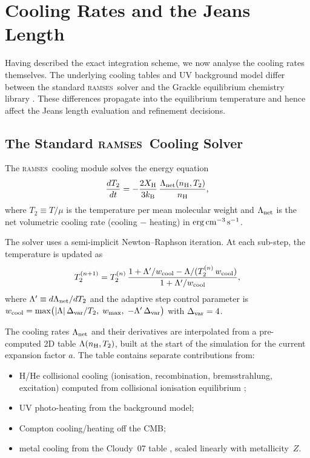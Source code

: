 \documentclass[fleqn,usenatbib]{mnras}
\newcommand{\ramses}{\textsc{ramses}}
\begin{document}
\section{Cooling Rates and the Jeans Length}
\label{sec:cooling}

Having described the exact integration scheme, we now analyse the
cooling rates themselves.  The underlying cooling tables and UV
background model differ between the standard \ramses\ solver and the
Grackle equilibrium chemistry library \citep{Smith2017}.  These
differences propagate into the equilibrium temperature and hence affect
the Jeans length evaluation and refinement decisions.


\subsection{The Standard \ramses\ Cooling Solver}
\label{sec:ramses_cooling}

The \ramses\ cooling module solves the energy equation
\begin{equation}
  \frac{dT_2}{dt} = -\frac{2 X_{\rm H}}{3 k_{\rm B}}\,
  \frac{\Lambda_{\rm net}(n_{\rm H}, T_2)}{n_{\rm H}},
  \label{eq:cooling_ode}
\end{equation}
where $T_2 \equiv T/\mu$ is the temperature per mean molecular weight
and $\Lambda_{\rm net}$ is the net volumetric cooling rate
(cooling $-$ heating) in $\rm erg\,cm^{-3}\,s^{-1}$.

The solver uses a semi-implicit Newton--Raphson iteration.  At each
sub-step, the temperature is updated as
\begin{equation}
  T_2^{(n+1)} = T_2^{(n)}\,
  \frac{1 + \Lambda'/w_{\rm cool} - \Lambda/(T_2^{(n)}\,w_{\rm cool})}
       {1 + \Lambda'/w_{\rm cool}},
  \label{eq:NR_update}
\end{equation}
where $\Lambda' \equiv d\Lambda_{\rm net}/dT_2$ and the adaptive step
control parameter is
$w_{\rm cool} = \max\bigl(|\Lambda|\,\Delta_{\rm var}/T_2,\;
w_{\rm max},\;{-\Lambda'\,\Delta_{\rm var}}\bigr)$
with $\Delta_{\rm var} = 4$.

The cooling rates $\Lambda_{\rm net}$ and their derivatives are
interpolated from a pre-computed 2D table
$\Lambda(n_{\rm H}, T_2)$, built at the start of the simulation for the
current expansion factor $a$.  The table contains separate contributions
from:
\begin{itemize}
  \item H/He collisional cooling (ionisation, recombination,
    bremsstrahlung, excitation) computed from collisional ionisation
    equilibrium \citep[CIE;][]{Sutherland1993};
  \item UV photo-heating from the \citet{Courty2004} background model;
  \item Compton cooling/heating off the CMB;
  \item metal cooling from the Cloudy~07 table
    \citep{Ploeckinger2015}, scaled linearly with metallicity~$Z$.
\end{itemize}
\end{document}
